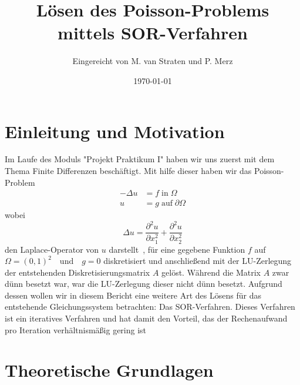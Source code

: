\documentclass{scrartcl}
\title{Lösen des Poisson-Problems mittels SOR-Verfahren}
\author{%
  Eingereicht von M. van Straten und P. Merz
}
\date{\today}
\theoremstyle{definition}
\begin{document}
\maketitle
\tableofcontents
\cleardoublepage%


\section{Einleitung und Motivation}
Im Laufe des Moduls "Projekt Praktikum I" haben wir uns zuerst mit dem Thema Finite Differenzen
beschäftigt. Mit hilfe dieser haben wir das Poisson-Problem
\begin{align}\label{Eq:Poisson}
    -\Delta u & = f \; \text{in} \; \Omega           \\
    u         & = g \; \text{auf} \; \partial \Omega
\end{align}
wobei
\begin{equation*}
    \Delta u = \frac{\partial^2 u}{\partial x_1^2} + \frac{\partial^2 u}{\partial x_2^2}
\end{equation*}
den Laplace-Operator von \(u\) darstellt\ \cite{PPI_Poisson}, für eine gegebene Funktion \(f\)
auf \(\Omega = {(0, 1)}^2 \quad \text{und} \quad g = 0\) diskretisiert und anschließend mit 
der LU-Zerlegung der entstehenden Diskretisierungsmatrix \(A\) gelöst. Während die Matrix \(A\) zwar dünn besetzt war,
war die LU-Zerlegung dieser nicht dünn besetzt. Aufgrund dessen wollen wir in diesem Bericht eine weitere Art des
Lösens für das entstehende Gleichungssystem betrachten: Das SOR-Verfahren. Dieses Verfahren ist ein iteratives Verfahren
und hat damit den Vorteil, das der Rechenaufwand pro Iteration verhältnismäßig gering ist \cite{AB3}




\section{Theoretische Grundlagen}
\end{document}
